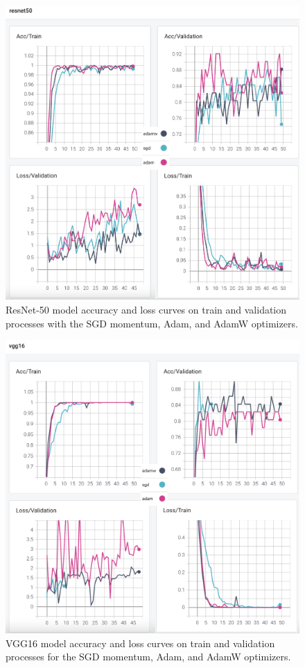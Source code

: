 \begin{figure}[!h]
	\centering
	\includegraphics[width=\linewidth]{fig/resnet50.png}
	\vspace{2mm}
	\caption{ResNet-50 model accuracy and loss curves on train and validation processes with the SGD momentum, Adam, and AdamW optimizers.}
	\label{fig:resnet50_plots}
\end{figure}

\begin{figure}[!h]
	\centering
	\includegraphics[width=\linewidth]{fig/vgg16.png}
	\vspace{2mm}
	\caption{VGG16 model accuracy and loss curves on train and validation processes for the SGD momentum, Adam, and AdamW optimizers.}
	\label{fig:vgg16_plots}
\end{figure}

